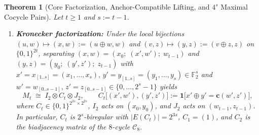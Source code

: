\documentclass[11pt,reqno]{amsart}
\newtheorem{theorem}{Theorem}[section]
\theoremstyle{definition}
\theoremstyle{remark}
\newcommand{\FF}{\mathbb{F}}
\newcommand{\ind}{\mathbf{1}}
\newcommand{\bv}{\mathbf{c}}
\numberwithin{equation}{section}
\begin{document}
\begin{theorem}[Core Factorization, Anchor-Compatible Lifting, and $4^s$ Maximal Cocycle Pairs]
  \label{thm:factorization-bicliques}
  Let $t \ge 1$ and $s := t - 1$.
  \begin{enumerate}[leftmargin=2em,label=\textup{(\alph*)}]
    \item \textbf{Kronecker factorization:} Under the local bijections $(u, w) \mapsto (x, w) := (u \oplus w, w)$ and $(v, z) \mapsto (y, z) := (v \oplus z, z)$ on $\{0, 1\}^{2t}$, separating $(x, w) = (x_0;\; (x', w');\; w_{t-1})$ and $(y, z) = (y_0;\; (y', z');\; z_{t-1})$ with $x' = x_{[1..s]} = (x_1, \dots, x_s),\, y' = y_{[1..s]} = (y_1, \dots, y_s) \in \FF_2^s$ and $w' = w_{[0..s-1]},\, z' = z_{[0..s-1]} \in \{0, \dots, 2^s - 1\}$ yields
    \begin{equation}
      \label{eq:kronecker-Mt}
      M_t \;\cong\; I_2 \otimes C_t \otimes J_2, \qquad C_t\bigl[(x', w'), (y', z')\bigr] := \ind\bigl[x' \oplus y' = \bv(w', z')\bigr],
    \end{equation}
    where $C_t \in \{0, 1\}^{2^{2s} \times 2^{2s}}$, $I_2$ acts on $(x_0, y_0)$, and $J_2$ acts on $(w_{t-1}, z_{t-1})$. In particular, $C_t$ is $2^s$-biregular with $|E(C_t)| = 2^{3s}$, $C_1 = (1)$, and $C_2$ is the biadjacency matrix of the $8$-cycle $\mathcal{C}_8$.


\end{enumerate}
\end{theorem}
\end{document}

